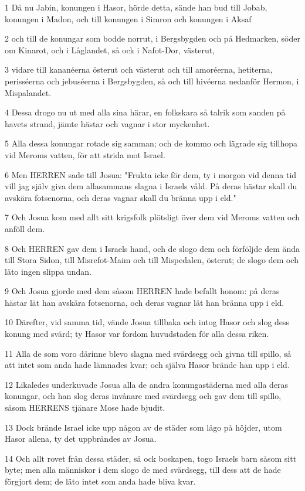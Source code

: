 \par 1 Då nu Jabin, konungen i Hasor, hörde detta, sände han bud till Jobab, konungen i Madon, och till konungen i Simron och konungen i Aksaf
\par 2 och till de konungar som bodde norrut, i Bergsbygden och på Hedmarken, söder om Kinarot, och i Låglandet, så ock i Nafot-Dor, västerut,
\par 3 vidare till kananéerna österut och västerut och till amoréerna, hetiterna, perisséerna och jebuséerna i Bergsbygden, så och till hivéerna nedanför Hermon, i Mispalandet.
\par 4 Dessa drogo nu ut med alla sina härar, en folkskara så talrik som sanden på havets strand, jämte hästar och vagnar i stor myckenhet.
\par 5 Alla dessa konungar rotade sig samman; och de kommo och lägrade sig tillhopa vid Meroms vatten, för att strida mot Israel.
\par 6 Men HERREN sade till Josua: "Frukta icke för dem, ty i morgon vid denna tid vill jag själv giva dem allasammans slagna i Israels våld. På deras hästar skall du avskära fotsenorna, och deras vagnar skall du bränna upp i eld."
\par 7 Och Josua kom med allt sitt krigsfolk plötsligt över dem vid Meroms vatten och anföll dem.
\par 8 Och HERREN gav dem i Israels hand, och de slogo dem och förföljde dem ända till Stora Sidon, till Misrefot-Maim och till Mispedalen, österut; de slogo dem och läto ingen slippa undan.
\par 9 Och Josua gjorde med dem såsom HERREN hade befallt honom: på deras hästar lät han avskära fotsenorna, och deras vagnar lät han bränna upp i eld.
\par 10 Därefter, vid samma tid, vände Josua tillbaka och intog Hasor och slog dess konung med svärd; ty Hasor var fordom huvudstaden för alla dessa riken.
\par 11 Alla de som voro därinne blevo slagna med svärdsegg och givna till spillo, så att intet som anda hade lämnades kvar; och själva Hasor brände han upp i eld.
\par 12 Likaledes underkuvade Josua alla de andra konungastäderna med alla deras konungar, och han slog deras invånare med svärdsegg och gav dem till spillo, såsom HERRENS tjänare Mose hade bjudit.
\par 13 Dock brände Israel icke upp någon av de städer som lågo på höjder, utom Hasor allena, ty det uppbrändes av Josua.
\par 14 Och allt rovet från dessa städer, så ock boskapen, togo Israels barn såsom sitt byte; men alla människor i dem slogo de med svärdsegg, till dess att de hade förgjort dem; de läto intet som anda hade bliva kvar.
